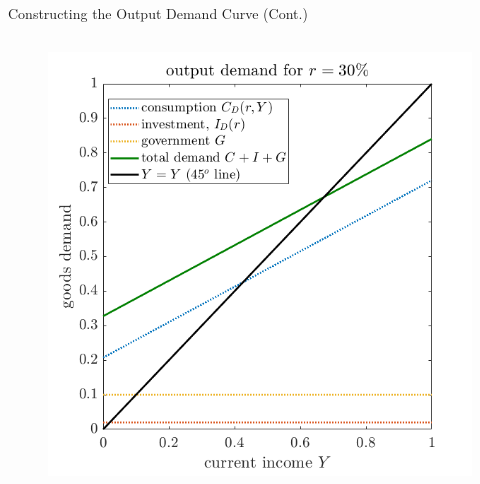 \documentclass[11pt,aspectratio=169,usenames,dvipsnames]{beamer}
\begin{document}
\begin{frame}{Constructing the Output Demand Curve (Cont.)}
\begin{columns}
\begin{column}{0.5\textwidth}
\begin{figure}
{                \includegraphics[width=\textwidth]{./figures/OutputDemand_2.png}}
            \end{figure}
        \end{column}
    \end{columns}
\end{frame}
\end{document}
